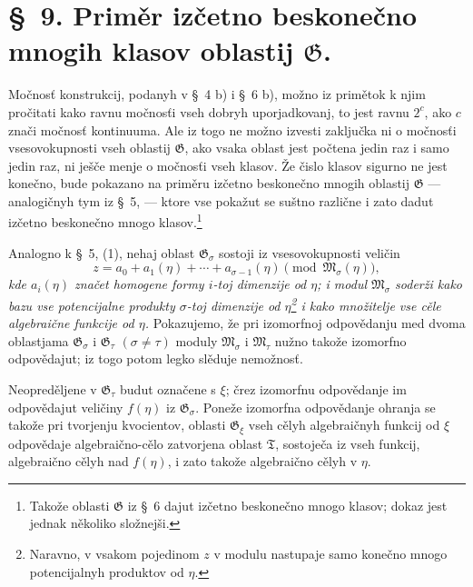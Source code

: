 \documentclass[11pt]{article}
\begin{document}
\section*{\S\ 9. Priměr izčetno beskonečno mnogih klasov oblastij $\mathfrak G$.}

Močnosť konstrukcij, podanyh v \S\ 4 b) i \S\ 6 b), možno iz primětok k njim
pročitati kako ravnu močnosťi vseh dobryh uporjadkovanj, to jest ravnu $2^c$,
ako $c$ znači močnosť kontinuuma. Ale iz togo ne možno izvesti zaključka ni o
močnosťi vsesovokupnosti vseh oblastij $\mathfrak G$, ako vsaka oblast jest
počtena jedin raz i samo jedin raz, ni ješče menje o močnosťi vseh klasov. Že
čislo klasov sigurno ne jest konečno, bude pokazano na priměru izčetno
beskonečno mnogih oblastij $\mathfrak G$ --- analogičnyh tym iz \S\ 5, ---
ktore vse pokažut se suštno različne i zato dadut izčetno beskonečno mnogo
klasov.\footnote{Takože oblasti $\mathfrak G$ iz \S\ 6 dajut izčetno
beskonečno mnogo klasov; dokaz jest jednak několiko složnejši.}

Analogno k \S\ 5, (1), nehaj oblast $\mathfrak G_\sigma$ sostoji iz
vsesovokupnosti veličin
\begin{equation}
 z=a_0+a_1(\eta)+\cdots+a_{\sigma-1}(\eta)
 \pmod{\mathfrak M_\sigma(\eta)},
\tag{1}
\end{equation}
{\itshape kde $a_i(\eta)$ značet homogene formy $i$-toj dimenzije od $\eta$;
i modul $\mathfrak M_\sigma$ soderži kako bazu vse potencijalne produkty
$\sigma$-toj dimenzije od $\eta$\footnote{Naravno, v vsakom pojedinom $z$ v
modulu nastupaje samo konečno mnogo potencijalnyh produktov od $\eta$.} i
kako množitelje vse cěle algebraične funkcije od $\eta$.} Pokazujemo, že pri
izomorfnoj odpovědanju med dvoma oblastjama $\mathfrak G_\sigma$ i
$\mathfrak G_\tau$ $(\sigma\ne\tau)$ moduly $\mathfrak M_\sigma$ i
$\mathfrak M_\tau$ nužno takože izomorfno odpovědajut; iz togo potom legko
slěduje nemožnosť.

Neopreděljene v $\mathfrak G_\tau$ budut označene s $\xi$; črez izomorfnu
odpovědanje im odpovědajut veličiny $f(\eta)$ iz $\mathfrak G_\sigma$. Poneže
izomorfna odpovědanje ohranja se takože pri tvorjenju kvocientov, oblasti
$\mathfrak G_\xi$ vseh cělyh algebraičnyh funkcij od $\xi$ odpovědaje
algebraično-cělo zatvorjena oblast $\mathfrak T$, sostoječa iz vseh funkcij,
algebraično cělyh nad $f(\eta)$, i zato takože algebraično cělyh v $\eta$.
\end{document}
